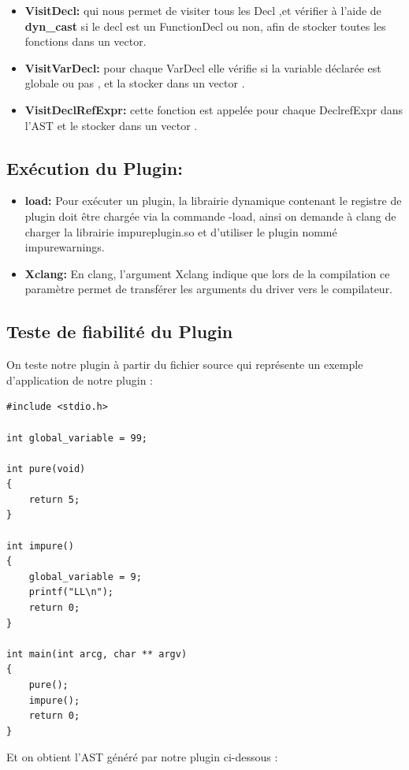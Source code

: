\documentclass[12pt,a4paper]{article}
\begin{document}
\begin{itemize}
\item  \textbf{VisitDecl:} qui nous permet de visiter tous les Decl ,et vérifier à l’aide de \textbf{ dyn\_cast} si le decl est un FunctionDecl ou non, afin de stocker toutes les fonctions dans  un vector.
\item \textbf{VisitVarDecl:} pour chaque VarDecl elle vérifie si la variable déclarée est globale ou pas , et la stocker dans un vector .
\item \textbf{VisitDeclRefExpr:} cette fonction est appelée pour chaque DeclrefExpr dans l’AST et le stocker dans un vector .
\end{itemize}

\subsection{ Exécution du Plugin:}

\begin{itemize}
    \item \textbf{load:}
Pour exécuter un plugin, la librairie dynamique contenant le registre de plugin doit être chargée via la commande -load, ainsi on demande à clang de charger la librairie impureplugin.so et d'utiliser le plugin nommé  impurewarnings.
\item \textbf{ Xclang:}
En clang, l'argument Xclang indique que lors de la compilation ce paramètre permet de transférer les arguments du driver vers le compilateur.
\end{itemize}
\subsection{Teste de fiabilité du Plugin}
On teste notre plugin à partir du fichier source qui représente un exemple d'application de notre plugin : 

\begin{lstlisting}
#include <stdio.h>

int global_variable = 99;

int pure(void)
{
	return 5;
}

int impure()
{	
	global_variable = 9;
	printf("LL\n");
	return 0;
}

int main(int arcg, char ** argv)
{
	pure();
	impure();
	return 0;
}
\end{lstlisting}

Et on obtient l'AST généré par notre plugin ci-dessous :
\end{document}
